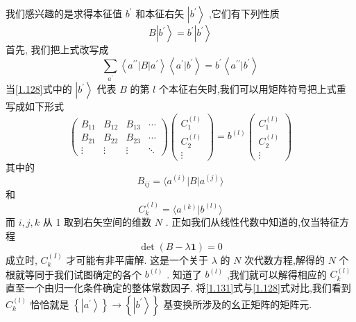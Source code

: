 	我们感兴趣的是求得本征值 ${b}^{\prime }$ 和本征右矢 $\left| {b}^{\prime }\right\rangle$ ,它们有下列性质
	\begin{equation}\label{1.128}
		B\left| {b}^{\prime }\right\rangle = {b}^{\prime }\left| {b}^{\prime }\right\rangle
	\end{equation}
	首先, 我们把上式改写成
	\begin{equation}
		\mathop{\sum }\limits_{{a}^{\prime }}\left\langle {{a}^{\prime \prime }\left| B\right| {a}^{\prime }}\right\rangle \left\langle {{a}^{\prime } | {b}^{\prime }}\right\rangle = {b}^{\prime }\left\langle {{a}^{\prime \prime } | {b}^{\prime }}\right\rangle
	\end{equation}
	当\ref{1.128}式中的 $\left| {b}^{\prime }\right\rangle$ 代表 $B$ 的第 $l$ 个本征右矢时,我们可以用矩阵符号把上式重写成如下形式
	\begin{equation}
		\left( \begin{matrix} {B}_{11} & {B}_{12} & {B}_{13} & \cdots \\ {B}_{21} & {B}_{22} & {B}_{23} & \cdots \\ \vdots & \vdots & \vdots & \ddots \end{matrix}\right) \left( \begin{matrix} {C}_{1}^{\left( l\right) } \\ {C}_{2}^{\left( l\right) } \\ \vdots \end{matrix}\right) = {b}^{\left( l\right) }\left( \begin{matrix} {C}_{1}^{\left( l\right) } \\ {C}_{2}^{\left( l\right) } \\ \vdots \end{matrix}\right)
	\end{equation}
	其中的
	\begin{equation}\label{1.131}
		{B}_{ij} = \langle {{a}^{\left( i\right) }\left| B\right| {a}^{\left( j\right) }}\rangle
	\end{equation}
	和
	\begin{equation}
		{C}_{k}^{\left( l\right) } = \langle {{a}^{\left( k\right) } | {b}^{\left( l\right) }}\rangle
	\end{equation}
	而 $i, j, k$ 从 1 取到右矢空间的维数 $N$ . 正如我们从线性代数中知道的,仅当特征方程
	\begin{equation}
		\det \left( {B - {\lambda \textbf{1}}}\right) = 0
	\end{equation}
	成立时, ${C}_{k}^{\left( I\right) }$ 才可能有非平庸解. 这是一个关于 $\lambda$ 的 $N$ 次代数方程,解得的 $N$ 个根就等同于我们试图确定的各个 ${b}^{\left( l\right) }$ . 知道了 ${b}^{\left( l\right) }$ ,我们就可以解得相应的 ${C}_{k}^{\left( l\right) }$ 直至一个由归一化条件确定的整体常数因子. 将\ref{1.131}式与\ref{1.128}式对比,我们看到 ${C}_{k}^{\left( l\right) }$ 恰恰就是 $\left\{ \left| {a}^{\prime }\right\rangle \right\} \rightarrow \left\{ \left| {b}^{\prime }\right\rangle \right\}$ 基变换所涉及的幺正矩阵的矩阵元.
	
